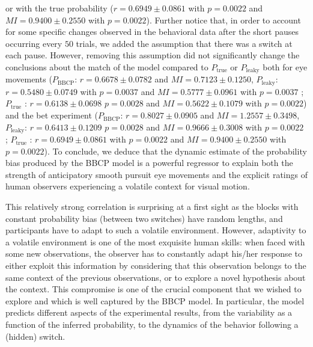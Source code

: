 \documentclass[12pt,english]{article}%
\newcommand{\AM}[1]{\textbf{\textcolor{blue}{[AM: #1]}}}
\newcommand{\CP}[1]{\textbf{\textcolor{green}{[CP: #1]}}}
\begin{document}
or with the true probability ($r = 0.6949 \pm 0.0861 $ with $p=0.0022$ and $MI =  0.9400 \pm 0.2550$ with $p=0.0022$). %
Further notice that, in order to account for some specific changes 
observed in the behavioral data after the short pauses 
occurring every $50$ trials, 
we added the assumption %
that there was a switch at each pause. 
However, removing this assumption did not significantly change the conclusions about the match of the model
compared to $P_{\text{true}}$ or $P_{\text{leaky}}$ 
both for eye movements %
($P_{\text{BBCP}}$: $r = 0.6678 \pm 0.0782 $ and $MI =  0.7123 \pm 0.1250$, $P_{\text{leaky}}$: $r = 0.5480 \pm 0.0749 $ with $p=0.0037$ and $MI =  0.5777 \pm 0.0961$ with $p=0.0037$ ; $P_{\text{true}}$ : $r = 0.6138 \pm 0.0698 $ $p=0.0028$ and  $MI =  0.5622 \pm 0.1079$ with $p=0.0022$) %
and the bet experiment 
($P_{\text{BBCP}}$: $r = 0.8027 \pm 0.0905 $ and $MI =  1.2557 \pm 0.3498$, $P_{\text{leaky}}$: $r = 0.6413 \pm 0.1209$ $p=0.0028$ and $MI =  0.9666 \pm 0.3008$ with $p=0.0022$ ; $P_{\text{true}}$ : $r = 0.6949 \pm 0.0861 $ with $p=0.0022$ and $MI =  0.9400 \pm 0.2550$ with $p=0.0022$).
To conclude, we deduce that the dynamic estimate of the probability bias produced by the BBCP model
is a powerful regressor to explain 
both the strength of anticipatory smooth pursuit eye movements 
and the explicit ratings of human observers experiencing a volatile context for visual motion.

This relatively strong correlation is surprising at a first sight
as the blocks with constant probability bias (between two switches) have random lengths,
and participants have to adapt to such a volatile environment.
However, adaptivity to a volatile environment is one of the most exquisite human skills: 
when faced with some new observations,
the observer has to constantly adapt his/her response
to either exploit this information by considering that
this observation belongs to the same context of the previous observations, or to explore
a novel hypothesis about the context.
This compromise is one of the crucial component that we wished to explore
and which is well captured by the BBCP model.
In particular, the model predicts different aspects
of the experimental results,
from the variability as a function of the inferred probability,
to the dynamics of the behavior following a (hidden) switch.
\end{document}
